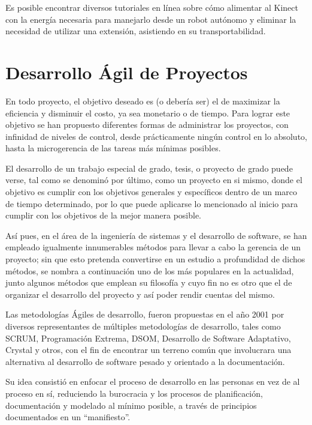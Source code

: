 Es posible encontrar diversos tutoriales en línea \cite{batterypoweredkinect} sobre cómo alimentar al Kinect con la energía necesaria para manejarlo desde un robot autónomo y eliminar la necesidad de utilizar una extensión, asistiendo en su transportabilidad.

\section{Desarrollo Ágil de Proyectos}

En todo proyecto, el objetivo deseado es (o debería ser) el de maximizar la eficiencia y disminuir el costo, ya sea monetario o de tiempo. Para lograr este objetivo se han propuesto diferentes formas de administrar los proyectos, con infinidad de niveles de control, desde prácticamente ningún control en lo absoluto, hasta la microgerencia de las tareas más mínimas posibles.

El desarrollo de un trabajo especial de grado, tesis, o proyecto de grado puede verse, tal como se denominó por último, como un proyecto en si mismo, donde el objetivo es cumplir con los objetivos generales y específicos dentro de un marco de tiempo determinado, por lo que puede aplicarse lo mencionado al inicio para cumplir con los objetivos de la mejor manera posible.

Así pues, en el área de la ingeniería de sistemas y el desarrollo de software, se han empleado igualmente innumerables métodos para llevar a cabo la gerencia de un proyecto; sin que esto pretenda convertirse en un estudio a profundidad de dichos métodos, se nombra a continuación uno de los más populares en la actualidad, junto algunos métodos que emplean su filosofía y cuyo fin no es otro que el de organizar el desarrollo del proyecto y así poder rendir cuentas del mismo.

Las metodologías Ágiles de desarrollo, fueron propuestas en el año 2001 por diversos representantes de múltiples metodologías de desarrollo, tales como SCRUM, Programación Extrema, DSOM, Desarrollo de Software Adaptativo, Crystal y otros, con el fin de encontrar un terreno común que involucrara una alternativa al desarrollo de software pesado y orientado a la documentación.

Su idea consistió en enfocar el proceso de desarrollo en las personas en vez de al proceso en sí, reduciendo la burocracia y los procesos de planificación, documentación y modelado al mínimo posible, a través de principios documentados en un ``manifiesto''.

